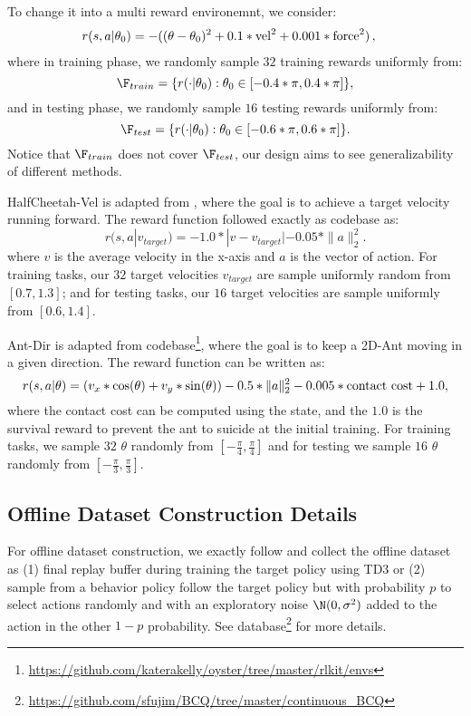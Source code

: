 To change it into a multi reward environemnt, we consider:
\begin{align*}
    &r(s,a|\theta_0)= -((\theta-\theta_0)^2 + 0.1 * \rm{vel}^2 + 0.001 * \rm{force}^2)\,,
\end{align*}
where in training phase, we randomly sample $32$ training rewards uniformly from:
$$
    \F_{train} = \{r(\cdot|\theta_0): \theta_0\in [-0.4 * \pi, 0.4 * \pi]\},
$$
and in testing phase, we randomly sample $16$ testing rewards uniformly from:
$$
    \F_{test} = \{r(\cdot|\theta_0): \theta_0\in [-0.6 * \pi, 0.6 * \pi]\}.
$$
Notice that $\F_{train}$ does not cover $\F_{test}$, our design aims to see generalizability of different methods.





HalfCheetah-Vel is adapted from \citet{finn2017model}, where the goal is to achieve a target velocity running forward.
The reward function followed exactly as \citet{rakelly2019efficient} codebase as:
$$
   r(s,a|v_{target}) = -1.0 * |v-v_{target}| - 0.05 * \|a\|_2^2.
$$
where $v$ is the average velocity in the x-axis and $a$ is the vector of action.
For training tasks, our $32$ target velocities $v_{target}$ are sample uniformly random from $[0.7, 1.3]$; and for testing tasks, our $16$ target velocities are sample uniformly from $[0.6, 1.4]$.

Ant-Dir is adapted from \citet{rakelly2019efficient} codebase\footnote{\url{https://github.com/katerakelly/oyster/tree/master/rlkit/envs}}, where the goal is to keep a 2D-Ant moving in a given direction.
The reward function can be written as:
$$
    r(s,a|\theta) = (v_x * \cos(\theta) +  v_y * \sin(\theta))
    - 0.5 * \|a\|_2^2 - 0.005 * \rm{contact~cost} + 1.0,
$$
where the contact cost can be computed using the state, and the $1.0$ is the survival reward to prevent the ant to suicide at the initial training.
For training tasks, we sample $32$ $\theta$ randomly from $[-\frac{\pi}{4},\frac{\pi}{4}]$ and for testing we sample $16$ $\theta$ randomly from $[-\frac{\pi}{3},\frac{\pi}{3}]$.

\subsection{Offline Dataset Construction Details}
For offline dataset construction, we exactly follow \citet{fujimoto2019off} and collect the offline dataset as (1) final replay buffer during training the target policy using TD3 or (2) sample from a behavior policy follow the target policy but with probability $p$ to select actions randomly and with an exploratory noise $\N(0,\sigma^2)$ added to the action in the other $1-p$ probability. See \citet{fujimoto2019off} database\footnote{\url{https://github.com/sfujim/BCQ/tree/master/continuous_BCQ}} for more details.


